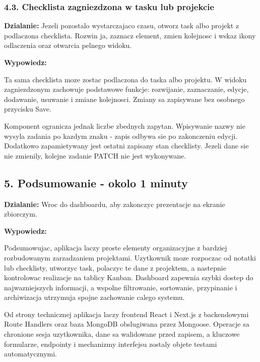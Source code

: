 \documentclass[
  polish,
  12pt,
  a4paper,
]{article}
\renewenvironment{quote}
  {\list{}{\leftmargin=1.2em\rightmargin=0.6em}%
   \item\relax\color{black}\setlength{\parskip}{0.7em}}
  {\endlist}
\begin{document}
\subsubsection{4.3. Checklista zagniezdzona w tasku lub
projekcie}\label{43-checklista-zagniezdzona-w-tasku-lub-projekcie}

\textbf{Dzialanie:} Jezeli pozostalo wystarczajaco czasu, otworz task
albo projekt z podlaczona checklista. Rozwin ja, zaznacz element, zmien
kolejnosc i wskaz ikony odlaczenia oraz otwarcia pelnego widoku.

\textbf{Wypowiedz:}

\begin{quote}
Ta sama checklista moze zostac podlaczona do taska albo projektu. W
widoku zagniezdzonym zachowuje podstawowe funkcje: rozwijanie,
zaznaczanie, edycje, dodawanie, usuwanie i zmiane kolejnosci. Zmiany sa
zapisywane bez osobnego przycisku Save.

Komponent ogranicza jednak liczbe zbednych zapytan. Wpisywanie nazwy nie
wysyla zadania po kazdym znaku - zapis odbywa sie po zakonczeniu edycji.
Dodatkowo zapamietywany jest ostatni zapisany stan checklisty. Jezeli
dane sie nie zmienily, kolejne zadanie PATCH nie jest wykonywane.
\end{quote}

\subsection{5. Podsumowanie - okolo 1
minuty}\label{5-podsumowanie---okolo-1-minuty}

\textbf{Dzialanie:} Wroc do dashboardu, aby zakonczyc prezentacje na
ekranie zbiorczym.

\textbf{Wypowiedz:}

\begin{quote}
Podsumowujac, aplikacja laczy proste elementy organizacyjne z bardziej
rozbudowanym zarzadzaniem projektami. Uzytkownik moze rozpoczac od
notatki lub checklisty, utworzyc task, polaczyc te dane z projektem, a
nastepnie kontrolowac realizacje na tablicy Kanban. Dashboard zapewnia
szybki dostep do najwazniejszych informacji, a wspolne filtrowanie,
sortowanie, przypinanie i archiwizacja utrzymuja spojne zachowanie
calego systemu.

Od strony technicznej aplikacja laczy frontend React i Next.js z
backendowymi Route Handlers oraz baza MongoDB obslugiwana przez
Mongoose. Operacje sa chronione sesja uzytkownika, dane sa walidowane
przed zapisem, a kluczowe formularze, endpointy i mechanizmy interfejsu
zostaly objete testami automatycznymi.
\end{quote}
\end{document}
